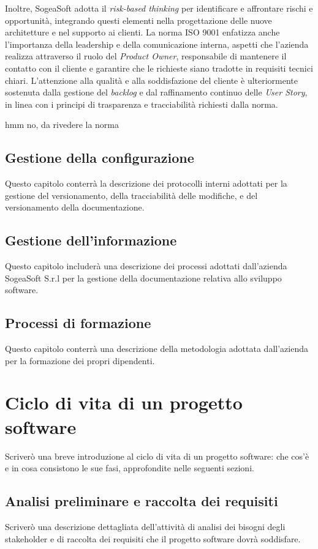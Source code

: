     \noindent Inoltre, SogeaSoft adotta il \textit{risk-based thinking }per identificare e affrontare rischi e opportunità, integrando questi elementi nella progettazione delle nuove architetture e nel supporto ai clienti. La norma ISO 9001 enfatizza anche l'importanza della leadership e della comunicazione interna, aspetti che l'azienda realizza attraverso il ruolo del \textit{Product Owner}, responsabile di mantenere il contatto con il cliente e garantire che le richieste siano tradotte in requisiti tecnici chiari. L'attenzione alla qualità e alla soddisfazione del cliente è ulteriormente sostenuta dalla gestione del \textit{backlog} e dal raffinamento continuo delle \textit{User Story}, in linea con i principi di trasparenza e tracciabilità richiesti dalla norma. 

    hmm no, da rivedere la norma
    
        \subsection{Gestione della configurazione}
        Questo capitolo conterrà la descrizione dei protocolli interni adottati per la gestione del
        versionamento, della tracciabilità delle modifiche, e del versionamento della documentazione.
        \subsection{Gestione dell’informazione}
        Questo capitolo includerà una descrizione dei processi adottati dall’azienda SogeaSoft S.r.l
        per la gestione della documentazione relativa allo sviluppo software.
        \subsection{Processi di formazione}
        Questo capitolo conterrà una descrizione della metodologia adottata dall’azienda per la formazione dei propri dipendenti.
    \section{Ciclo di vita di un progetto software}
    Scriverò una breve introduzione al ciclo di vita di un progetto software: che cos’è e in cosa
    consistono le sue fasi, approfondite nelle seguenti sezioni.
        \subsection{Analisi preliminare e raccolta dei requisiti}
        Scriverò una descrizione dettagliata dell’attività di analisi dei bisogni degli stakeholder e di
        raccolta dei requisiti che il progetto software dovrà soddisfare.
